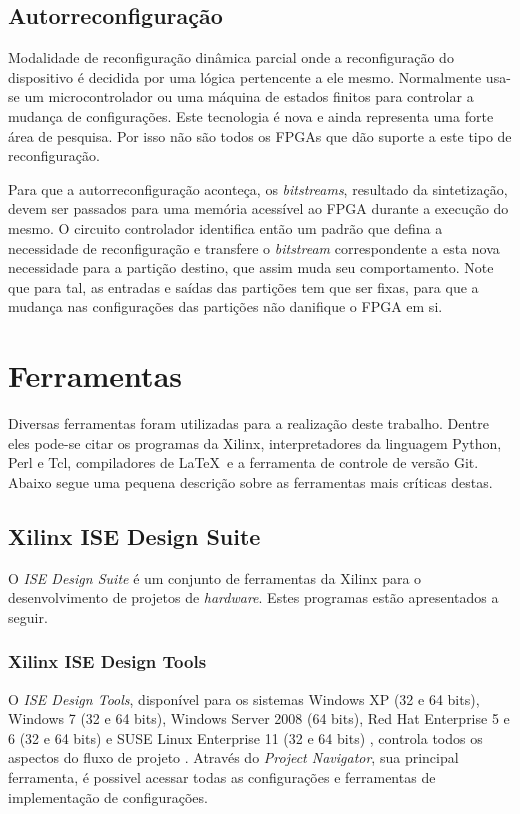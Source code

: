\documentclass[11pt,a4paper,oneside]{book}
\begin{document}
\subsection{Autorreconfigura\c{c}\~ao}
Modalidade de reconfigura\c{c}\~ao din\^amica parcial onde a reconfigura\c{c}\~ao do dispositivo \'e decidida por uma l\'ogica pertencente a ele mesmo.
Normalmente usa-se um microcontrolador ou uma m\'aquina de estados finitos para controlar a mudan\c{c}a de configura\c{c}\~oes.
Este tecnologia \'e nova e ainda representa uma forte \'area de pesquisa.
Por isso n\~ao s\~ao todos os FPGAs que d\~ao suporte a este tipo de reconfigura\c{c}\~ao.

Para que a autorreconfigura\c{c}\~ao aconte\c{c}a, os \textit{bitstreams}, resultado da sintetiza\c{c}\~ao, devem ser passados para uma mem\'oria acess\'i­vel ao FPGA durante a execu\c{c}\~ao do mesmo.
O circuito controlador identifica ent\~ao um padr\~ao que defina a necessidade de reconfigura\c{c}\~ao e transfere o \textit{bitstream} correspondente a esta nova necessidade para a parti\c{c}\~ao destino, que assim muda seu comportamento.
Note que para tal, as entradas e sa\'i­das das parti\c{c}\~oes tem que ser fixas, para que a mudan\c{c}a nas configura\c{c}\~oes das parti\c{c}\~oes n\~ao danifique o FPGA em si.

\section{Ferramentas}
Diversas ferramentas foram utilizadas para a realização deste trabalho.
Dentre eles pode-se citar os programas da Xilinx, interpretadores da linguagem Python, Perl e Tcl, compiladores de \LaTeX~e a ferramenta de controle de versão Git.
Abaixo segue uma pequena descrição sobre as ferramentas mais críticas destas.

\subsection{Xilinx ISE Design Suite}
O \textit{ISE Design Suite} é um conjunto de ferramentas da Xilinx para o desenvolvimento de projetos de \textit{hardware}.
Estes programas estão apresentados a seguir.

\subsubsection{Xilinx ISE Design Tools}
O \textit{ISE Design Tools}, disponível para os sistemas Windows XP (32 e 64 bits), Windows 7 (32 e 64 bits), Windows Server 2008 (64 bits), Red Hat Enterprise 5 e 6 (32 e 64 bits) e SUSE Linux Enterprise 11 (32 e 64 bits) \cite{ug631}, controla todos os aspectos do fluxo de projeto \cite{ug695}.
Através do \textit{Project Navigator}, sua principal ferramenta, é possivel acessar todas as configurações e ferramentas de implementação de configurações.
\end{document}
